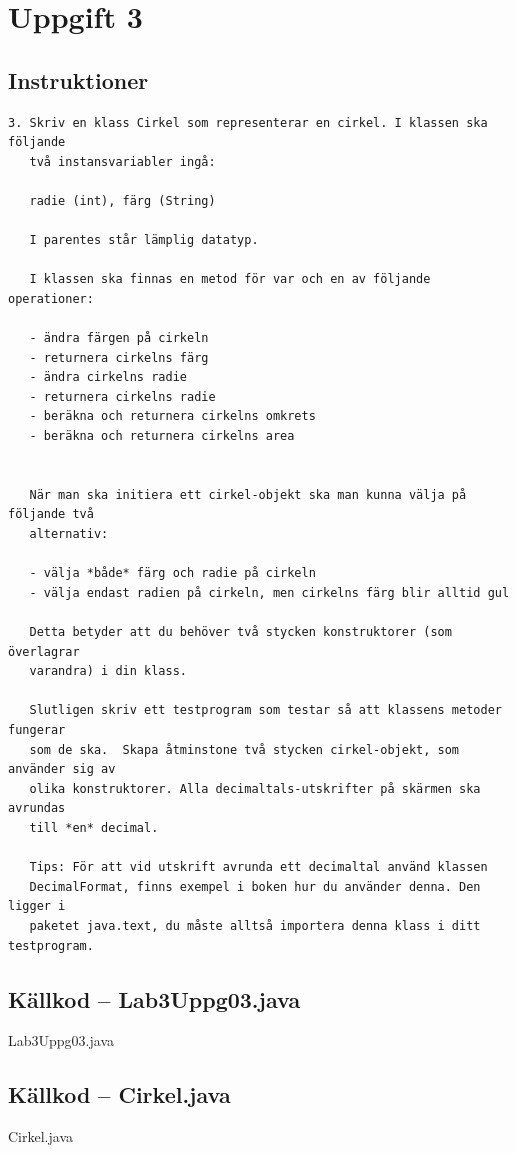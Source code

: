 \section{Uppgift 3}\label{sec:uppg03}

\subsection{Instruktioner}
\begin{verbatim}
3. Skriv en klass Cirkel som representerar en cirkel. I klassen ska följande
   två instansvariabler ingå:

   radie (int), färg (String)

   I parentes står lämplig datatyp.

   I klassen ska finnas en metod för var och en av följande operationer:

   - ändra färgen på cirkeln
   - returnera cirkelns färg
   - ändra cirkelns radie
   - returnera cirkelns radie
   - beräkna och returnera cirkelns omkrets
   - beräkna och returnera cirkelns area


   När man ska initiera ett cirkel-objekt ska man kunna välja på följande två
   alternativ:

   - välja *både* färg och radie på cirkeln
   - välja endast radien på cirkeln, men cirkelns färg blir alltid gul

   Detta betyder att du behöver två stycken konstruktorer (som överlagrar
   varandra) i din klass.

   Slutligen skriv ett testprogram som testar så att klassens metoder fungerar
   som de ska.  Skapa åtminstone två stycken cirkel-objekt, som använder sig av
   olika konstruktorer. Alla decimaltals-utskrifter på skärmen ska avrundas
   till *en* decimal.

   Tips: För att vid utskrift avrunda ett decimaltal använd klassen
   DecimalFormat, finns exempel i boken hur du använder denna. Den ligger i
   paketet java.text, du måste alltså importera denna klass i ditt testprogram.
\end{verbatim}


\subsection{Källkod -- Lab3Uppg03.java}
\caption{Lab3Uppg03.java}
\label{src:uppg03}

\subsection{Källkod -- Cirkel.java}
\caption{Cirkel.java}
\label{src:cirkel}


